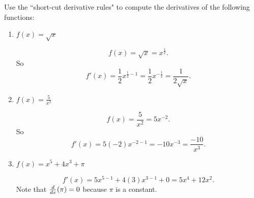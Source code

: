\documentclass[handout,nooutcomes]{ximera}
\begin{document}
\begin{problem}
Use the ``short-cut derivative rules" to compute the derivatives of the following functions:
	
	\begin{enumerate}
	
	\item $f(x) = \sqrt{x}$
	
		\begin{freeResponse}
		$$f(x) = \sqrt{x} = x^{\frac{1}{2}}.$$ 
		So 
		$$f'(x) = \frac{1}{2} x^{\frac{1}{2} - 1} = \frac{1}{2} x^{-\frac{1}{2}} = \frac{1}{2\sqrt{x}}.$$
		\end{freeResponse}
			
			
	
	\item $f(x) = \frac{5}{x^2}$
	
		\begin{freeResponse}
		$$f(x) = \frac{5}{x^2} = 5x^{-2}.$$  
		So 
		$$f'(x) = 5(-2) x^{-2-1} = -10x^{-3} = \frac{-10}{x^3}.$$  
		\end{freeResponse}
			
			
	
	\item $f(x) = x^5 + 4x^3 + \pi $
	
		\begin{freeResponse}
		$$f'(x) = 5x^{5-1} + 4(3)x^{3-1} + 0 = 5x^4 + 12x^2.$$  
		Note that $\frac{d}{dx} (\pi) = 0$ because $\pi$ is a constant.	
		\end{freeResponse}
			
			
	
	\end{enumerate}
\end{problem}
\end{document}
